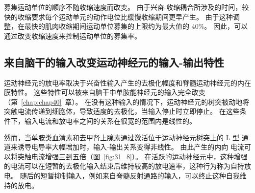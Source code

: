 募集运动单位的顺序不随收缩速度而改变。
由于兴奋-收缩耦合所涉及的时间，较快的收缩要求每个运动单元的动作电位比缓慢收缩期间更早产生。
由于这种调整，在最快的肌肉收缩期间运动单位募集的上限约为最大值的 40\%。
因此，可以通过改变收缩速度来控制运动单位的募集率。



\subsection{来自脑干的输入改变运动神经元的输入-输出特性}

运动神经元的放电率取决于兴奋性输入产生的去极化幅度和脊髓运动神经元的内在膜特性。
这些特性可以被来自脑干中单胺能神经元的输入完全改变（第~\ref{chap:chap40}~章）。
在没有这种输入的情况下，运动神经元的树突被动地将突触电流传递到细胞体，导致适度的去极化，当输入停止时立即停止。
在这些条件下，输入电流和放电率之间的关系在很宽的范围内是线性的。


然而，当单胺类血清素和去甲肾上腺素通过激活位于运动神经元树突上的 L 型  通道来诱导电导率大幅增加时，输入-输出关系变得非线性。
由此产生的内向  电流可以将突触电流增强三到五倍（图~\ref{fig:31_8}）。
在活跃的运动神经元中，这种增强的电流可以在短暂的去极化输入结束后维持较高的放电速率，这种行为称为自持放电。
随后的短暂抑制输入，例如来自脊髓反射通路的输入，可以终止这种自我维持的放电。



